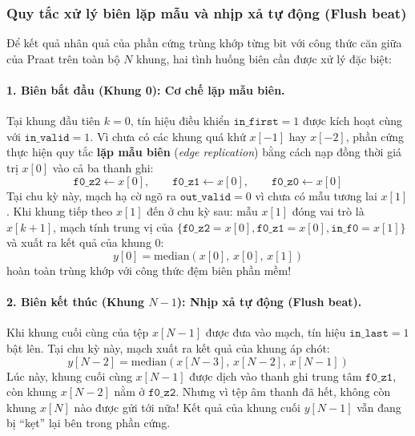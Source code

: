 \subsubsection*{Quy tắc xử lý biên lặp mẫu và nhịp xả tự động (Flush beat)}
Để kết quả nhân quả của phần cứng trùng khớp từng bit với công thức căn giữa của Praat trên toàn bộ $N$ khung, hai tình huống biên cần được xử lý đặc biệt:

\paragraph{1. Biên bắt đầu (Khung 0): Cơ chế lặp mẫu biên.}
Tại khung đầu tiên $k = 0$, tín hiệu điều khiển $\texttt{in\_first} = 1$ được kích hoạt cùng với $\texttt{in\_valid} = 1$. Vì chưa có các khung quá khứ $x[-1]$ hay $x[-2]$, phần cứng thực hiện quy tắc \textbf{lặp mẫu biên} (\emph{edge replication}) bằng cách nạp đồng thời giá trị $x[0]$ vào cả ba thanh ghi:
\begin{equation}
    \texttt{f0\_z2} \leftarrow x[0], \qquad \texttt{f0\_z1} \leftarrow x[0], \qquad \texttt{f0\_z0} \leftarrow x[0]
\end{equation}
Tại chu kỳ này, mạch hạ cờ ngõ ra $\texttt{out\_valid} = 0$ vì chưa có mẫu tương lai $x[1]$.
Khi khung tiếp theo $x[1]$ đến ở chu kỳ sau: mẫu $x[1]$ đóng vai trò là $x[k+1]$, mạch tính trung vị của $\{\texttt{f0\_z2}=x[0], \texttt{f0\_z1}=x[0], \texttt{in\_f0}=x[1]\}$ và xuất ra kết quả của khung 0:
\begin{equation}
    y[0] = \text{median}(x[0],\, x[0],\, x[1])
\end{equation}
hoàn toàn trùng khớp với công thức đệm biên phần mềm!

\paragraph{2. Biên kết thúc (Khung $N-1$): Nhịp xả tự động (Flush beat).}
Khi khung cuối cùng của tệp $x[N-1]$ được đưa vào mạch, tín hiệu $\texttt{in\_last} = 1$ bật lên. Tại chu kỳ này, mạch xuất ra kết quả của khung áp chót:
\begin{equation}
    y[N-2] = \text{median}(x[N-3],\, x[N-2],\, x[N-1])
\end{equation}
Lúc này, khung cuối cùng $x[N-1]$ được dịch vào thanh ghi trung tâm $\texttt{f0\_z1}$, còn khung $x[N-2]$ nằm ở $\texttt{f0\_z2}$. Nhưng vì tệp âm thanh đã hết, không còn khung $x[N]$ nào được gửi tới nữa! Kết quả của khung cuối $y[N-1]$ vẫn đang bị ``kẹt'' lại bên trong phần cứng.

